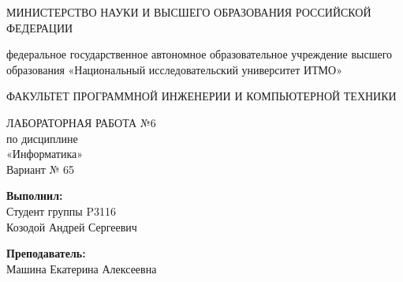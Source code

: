 





    \begin{center}
        МИНИСТЕРСТВО НАУКИ И ВЫСШЕГО ОБРАЗОВАНИЯ РОССИЙСКОЙ ФЕДЕРАЦИИ
        
        \vspace{0.75cm}
        
        федеральное государственное автономное образовательное учреждение высшего образования «Национальный исследовательский университет ИТМО»
        
        \vspace{0.75cm}
        
        ФАКУЛЬТЕТ ПРОГРАММНОЙ ИНЖЕНЕРИИ И КОМПЬЮТЕРНОЙ ТЕХНИКИ
        
        \vspace{1.5cm}
        
        ЛАБОРАТОРНАЯ РАБОТА №6\\
        по дисциплине\\
        «Информатика»\\
        
        \vspace{1cm}
        Вариант № 65
        
        \vspace{3cm}
        
        \begin{flushright}
        \textbf{Выполнил:}\\
        Студент группы P3116\\
        Козодой Андрей Сергеевич
        
        \textbf{Преподаватель:}\\
        Машина Екатерина Алексеевна
        \end{flushright}
    \end{center}